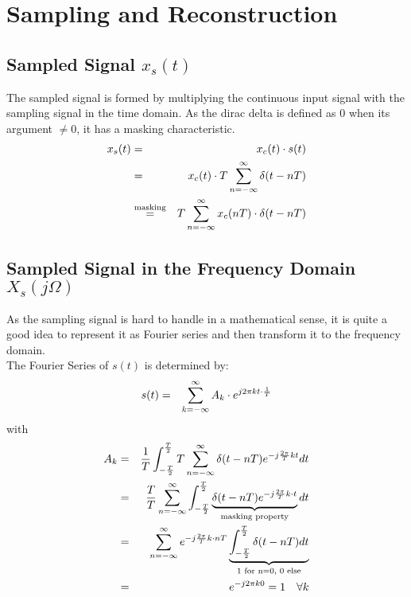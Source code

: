 \section{Sampling and Reconstruction} 

\subsection{Sampled Signal $x_s(t)$}

The sampled signal is formed by multiplying the continuous input signal with the sampling signal in the time domain. As the dirac delta is defined as 0 when its argument $\neq 0$, it has a masking characteristic.
\begin{eqnarray*}
x_s(t) & = & x_c(t) \cdot s(t) \\
       & = & x_c(t) \cdot T \sum_{n=-\infty}^{\infty} \delta (t-nT) \\
       & \overset{\text{masking}}{=}  & T \sum_{n=-\infty}^{\infty} x_c(nT) \cdot \delta (t-nT)
\end{eqnarray*}


\subsection{Sampled Signal in the Frequency Domain $X_s(j\Omega)$}

As the sampling signal is hard to handle in a mathematical sense, it is quite a good idea to represent it as Fourier series and then transform it to the frequency domain.\\
The Fourier Series of $s(t)$ is determined by:
\begin{eqnarray*}
s(t) & = & \sum_{k=-\infty}^{\infty} A_k \cdot e^{j2\pi k t \cdot \frac{1}{T}}
\end{eqnarray*}
with
\begin{eqnarray*}
A_k & = & \frac{1}{T} \int_{-\frac{T}{2}}^{\frac{T}{2}} T \sum_{n=-\infty}^{\infty} \delta (t-nT) e^{-j \frac{2\pi}{T}kt}  dt \\
& = & \frac{T}{T}  \sum_{n=-\infty}^{\infty} \int_{-\frac{T}{2}}^{\frac{T}{2}} \underbrace{\delta (t-nT) e^{-j \frac{2\pi}{T}k\cdot t}}_{\text{masking property}} dt \\
& = & \sum_{n=-\infty}^{\infty}  e^{-j \frac{2\pi}{T}k\cdot nT} \underbrace{\int_{-\frac{T}{2}}^{\frac{T}{2}}  \delta (t-nT) dt}_{\text{1 for n=0, 0 else}} \\
& = & e^{-j 2 \pi k 0 } = 1 \quad \forall k
\end{eqnarray*}

